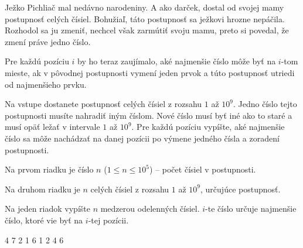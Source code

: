 




Ježko Pichliač mal nedávno narodeniny. A ako darček, dostal od svojej mamy postupnosť celých čísiel.
Bohužiaľ, táto postupnosť sa ježkovi hrozne nepáčila. Rozhodol sa ju zmeniť, nechcel však zarmútiť
svoju mamu, preto si povedal, že zmení práve jedno číslo.

Pre každú pozíciu $i$ by ho teraz zaujímalo, aké najmenšie číslo môže byť na $i$-tom mieste, ak v
pôvodnej postupnosti vymení jeden prvok a túto postupnosť utriedi od najmenšieho prvku.


Na vstupe dostanete postupnosť celých čísiel z rozsahu $1$ až $10^9$. Jedno číslo tejto postupnosti
musíte nahradiť iným číslom. Nové číslo musí byť iné ako to staré a musí opäť ležať v intervale $1$
až $10^9$. Pre každú pozíciu vypíšte, aké najmenšie číslo sa môže nachádzať na danej pozícii po
výmene jedného čísla a zoradení postupnosti. 


Na prvom riadku je číslo $n$ ($1 \leq n \leq 10^5$) -- počet čísiel v postupnosti.

Na druhom riadku je $n$ celých čísiel z rozsahu $1$ až $10^9$, určujúce postupnosť.


Na jeden riadok vypíšte $n$ medzerou odelenných čísiel. $i$-te číslo určuje najmenšie číslo, ktoré
vie byť na $i$-tej pozícii.


4 7 2 1 6
 1 2 4 6
\koniec


